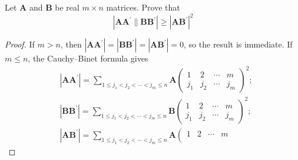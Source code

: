 \documentclass[12pt, a4paper, oneside]{book}
\begin{document}
\begin{question}
    Let $\mathbf{A}$ and $\mathbf{B}$ be real $m \times n$ matrices. Prove that
    \[
        \left|\mathbf{A} \mathbf{A}^{\prime} \| \mathbf{B} \mathbf{B}^{\prime}\right| \geq\left|\mathbf{A} \mathbf{B}^{\prime}\right|^2
    \]
    \begin{proof}
        If $m>n$, then $\left|\mathbf{A} \mathbf{A}^{\prime}\right|=\left|\mathbf{B} \mathbf{B}^{\prime}\right|=\left|\mathbf{A} \mathbf{B}^{\prime}\right|=0$, so the result is immediate.
        If $m \leq n$, the Cauchy--Binet formula gives
        \[
            \begin{aligned}
                 & \left|\mathbf{A} \mathbf{A}^{\prime}\right|=\sum_{1 \leq j_1<j_2<\cdots<j_m \leq n} \mathbf{A}\left(\begin{array}{cccc}
                                                                                                                               1   & 2   & \cdots & m   \\
                                                                                                                               j_1 & j_2 & \cdots & j_m
                                                                                                                           \end{array}\right)^2 ;                                    \\
                 & \left|\mathbf{B} \mathbf{B}^{\prime}\right|=\sum_{1 \leq j_1<j_2<\cdots<j_m \leq n} \mathbf{B}\left(\begin{array}{cccc}
                                                                                                                               1   & 2   & \cdots & m   \\
                                                                                                                               j_1 & j_2 & \cdots & j_m
                                                                                                                           \end{array}\right)^2 ;                                    \\
                 & \left|\mathbf{A} \mathbf{B}^{\prime}\right|=\sum_{1 \leq j_1<j_2<\cdots<j_m \leq n} \mathbf{A}\left(\begin{array}{cccc}
                                                                                                                               1   & 2   & \cdots & m   \\

\end{array}
\end{aligned}\]
\end{proof}
\end{question}
\end{document}
